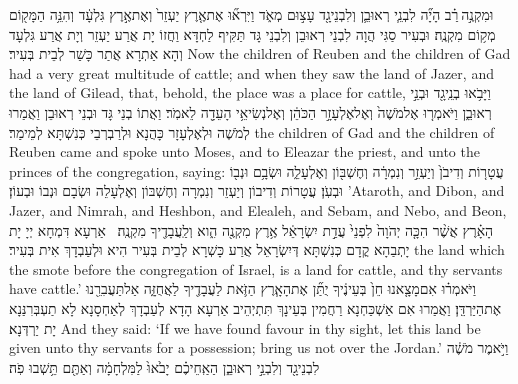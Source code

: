 \newperek
{}%
{וּמִקְנֶ֣ה \legarmeh  רַ֗ב הָיָ֞ה לִבְנֵ֧י רְאוּבֵ֛ן וְלִבְנֵי\maqqaf גָ֖ד עָצ֣וּם מְאֹ֑ד וַיִּרְא֞וּ אֶת\maqqaf אֶ֤רֶץ יַעְזֵר֙ וְאֶת\maqqaf אֶ֣רֶץ גִּלְעָ֔ד וְהִנֵּ֥ה הַמָּק֖וֹם מְק֥וֹם מִקְנֶֽה׃}
{וּבְעִיר סַגִּי הֲוָה לִבְנֵי רְאוּבֵן וְלִבְנֵי גָּד תַּקִּיף לַחְדָּא וַחֲזוֹ יָת אֲרַע יַעְזֵר וְיָת אֲרַע גִּלְעָד וְהָא אַתְרָא אֲתַר כָּשַׁר לְבֵית בְּעִיר׃}
{Now the children of Reuben and the children of Gad had a very great multitude of cattle; and when they saw the land of Jazer, and the land of Gilead, that, behold, the place was a place for cattle,}{}
{וַיָּבֹ֥אוּ בְנֵֽי\maqqaf גָ֖ד וּבְנֵ֣י רְאוּבֵ֑ן וַיֹּאמְר֤וּ אֶל\maqqaf מֹשֶׁה֙ וְאֶל\maqqaf אֶלְעָזָ֣ר הַכֹּהֵ֔ן וְאֶל\maqqaf נְשִׂיאֵ֥י הָעֵדָ֖ה לֵאמֹֽר׃}
{וַאֲתוֹ בְנֵי גָּד וּבְנֵי רְאוּבֵן וַאֲמַרוּ לְמֹשֶׁה וּלְאֶלְעָזָר כָּהֲנָא וּלְרַבְרְבֵי כְּנִשְׁתָּא לְמֵימַר׃}
{the children of Gad and the children of Reuben came and spoke unto Moses, and to Eleazar the priest, and unto the princes of the congregation, saying:}{}
{עֲטָר֤וֹת וְדִיבֹן֙ וְיַעְזֵ֣ר וְנִמְרָ֔ה וְחֶשְׁבּ֖וֹן וְאֶלְעָלֵ֑ה וּשְׂבָ֥ם וּנְב֖וֹ וּבְעֹֽן׃}
{עֲטָרוֹת וְדִיבוֹן וְיַעְזֵר וְנִמְרָה וְחֶשְׁבּוֹן וְאֶלְעָלֵה וּשְׂבָם וּנְבוֹ וּבְעוֹן׃}
{’Ataroth, and Dibon, and Jazer, and Nimrah, and Heshbon, and Elealeh, and Sebam, and Nebo, and Beon,}{}
{הָאָ֗רֶץ אֲשֶׁ֨ר הִכָּ֤ה יְהֹוָה֙ לִפְנֵי֙ עֲדַ֣ת יִשְׂרָאֵ֔ל אֶ֥רֶץ מִקְנֶ֖ה הִ֑וא וְלַֽעֲבָדֶ֖יךָ מִקְנֶֽה׃ \setuma }
{אַרְעָא דִּמְחָא יְיָ יָת יָתְבַהָא קֳדָם כְּנִשְׁתָּא דְּיִשְׂרָאֵל אֲרַע כָּשְׁרָא לְבֵית בְּעִיר הִיא וּלְעַבְדָךְ אִית בְּעִיר׃}
{the land which the \lord\space smote before the congregation of Israel, is a land for cattle, and thy servants have cattle.’}{}
{וַיֹּאמְר֗וּ אִם\maqqaf מָצָ֤אנוּ חֵן֙ בְּעֵינֶ֔יךָ יֻתַּ֞ן אֶת\maqqaf הָאָ֧רֶץ הַזֹּ֛את לַעֲבָדֶ֖יךָ לַאֲחֻזָּ֑ה אַל\maqqaf תַּעֲבִרֵ֖נוּ אֶת\maqqaf הַיַּרְדֵּֽן׃}
{וַאֲמַרוּ אִם אַשְׁכַּחְנָא רַחֲמִין בְּעֵינָךְ תִּתְיְהֵיב אַרְעָא הָדָא לְעַבְדָךְ לְאַחְסָנָא לָא תַעְבְּרִנַּנָא יָת יַרְדְּנָא׃}
{And they said: ‘If we have found favour in thy sight, let this land be given unto thy servants for a possession; bring us not over the Jordan.’}{}
{וַיֹּ֣אמֶר מֹשֶׁ֔ה לִבְנֵי\maqqaf גָ֖ד וְלִבְנֵ֣י רְאוּבֵ֑ן הַאַֽחֵיכֶ֗ם יָבֹ֙אוּ֙ לַמִּלְחָמָ֔ה וְאַתֶּ֖ם תֵּ֥שְׁבוּ פֹֽה׃}
